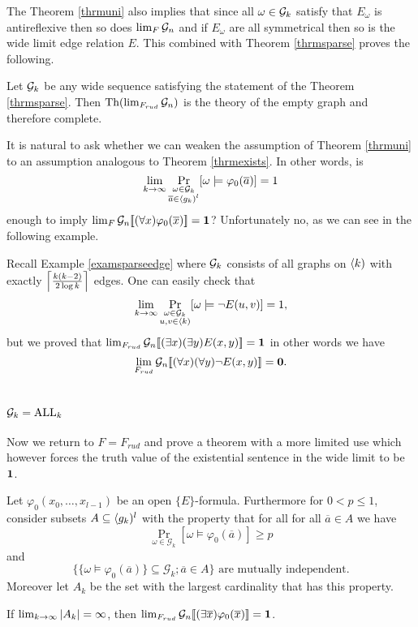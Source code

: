 The Theorem \ref{thrmuni} also implies that since all $\omega\in\mathcal{G}_k$ satisfy that $E_\omega$ is antireflexive then so does $\lim_{F}\mathcal{G}_n$ and if $E_\omega$ are all symmetrical then so is the wide limit edge relation $E$. This combined with Theorem \ref{thrmsparse} proves the following.

\begin{crll}\label{crlltoosparse}
Let $\mathcal{G}_k$ be any wide sequence satisfying the statement of the Theorem \ref{thrmsparse}. Then $\text{Th}(\lim_{F_{rud}}\mathcal{G}_n)$ is the theory of the empty graph and therefore complete. 
\end{crll}

It is natural to ask whether we can weaken the assumption of Theorem \ref{thrmuni} to an assumption analogous to Theorem \ref{thrmexists}. In other words, is
\[\lim_{k\to\infty}\Pr_{\substack{\omega\in\mathcal{G}_k\\\overline a\in \langle g_k)^l}}[\omega\models\varphi_0(\overline a)]=1\]
enough to imply $\lim_F\mathcal{G}_n[\![(\forall x)\varphi_0(\overline x)]\!]=\textbf{1}$? Unfortunately no, as we can see in the following example.

\begin{exam}Recall Example \ref{examsparseedge} where $\mathcal{G}_k$ consists of all graphs on $\langle k)$ with exactly $\left \lceil {\frac{k(k-2)}{2\log k}} \right \rceil$ edges. One can easily check that
\[\lim_{k\to\infty}\Pr_{\substack{\omega\in\mathcal{G}_k\\u,v \in \langle k)}}[\omega\models \lnot E(u,v)]=1,\]
but we proved that $\lim_{F_{rud}}\mathcal{G}_n [\![(\exists x)(\exists y)E(x,y)]\!]=\textbf{1}$ in other words we have \[\lim_{F_{rud}}\mathcal{G}_n[\![(\forall x)(\forall y)\lnot E(x,y)]\!]=\textbf{0}.\]
\end{exam}

\section{\texorpdfstring{$\mathcal{G}_k=\text{ALL}_k$}{Gk=ALLk}}

Now we return to $F=F_{rud}$ and prove a theorem with a more limited use which however forces the truth value of the existential sentence in the wide limit to be $\textbf{1}$.

\begin{thrm}\label{mutindfind}
Let $\varphi_0(x_0,\dots,x_{l-1})$ be an open $\{E\}$-formula. Furthermore for $0<p\leq 1$, consider subsets $A\subseteq\langle g_k)^l$ with the property that for all for all $\overline a \in A$ we have
\[\Pr_{\omega\in\mathcal{G}_k}[\omega\models \varphi_0(\overline a)]\geq p\]
and
\[\text{$\{\{\omega\models\varphi_0(\overline a)\}\subseteq \mathcal{G}_k;\overline a \in A\}$ are mutually independent.}\]
Moreover let $A_k$ be the set with the largest cardinality that has this property.

If $\lim_{k\to\infty} \left|{A_k}\right|=\infty$, then $\lim_{F_{rud}} \mathcal{G}_n[\![(\exists \overline x)\varphi_0(\overline x)]\!]=\textbf{1}$.
\end{thrm}


